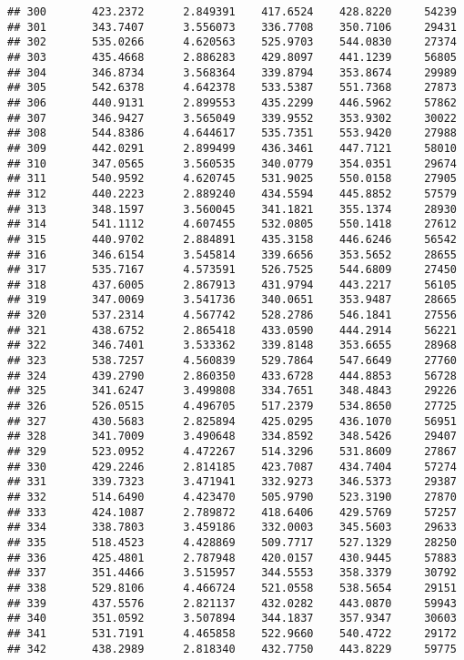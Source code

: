 \documentclass[]{article}
\begin{document}
\begin{verbatim}
## 300       423.2372      2.849391    417.6524    428.8220     54239
## 301       343.7407      3.556073    336.7708    350.7106     29431
## 302       535.0266      4.620563    525.9703    544.0830     27374
## 303       435.4668      2.886283    429.8097    441.1239     56805
## 304       346.8734      3.568364    339.8794    353.8674     29989
## 305       542.6378      4.642378    533.5387    551.7368     27873
## 306       440.9131      2.899553    435.2299    446.5962     57862
## 307       346.9427      3.565049    339.9552    353.9302     30022
## 308       544.8386      4.644617    535.7351    553.9420     27988
## 309       442.0291      2.899499    436.3461    447.7121     58010
## 310       347.0565      3.560535    340.0779    354.0351     29674
## 311       540.9592      4.620745    531.9025    550.0158     27905
## 312       440.2223      2.889240    434.5594    445.8852     57579
## 313       348.1597      3.560045    341.1821    355.1374     28930
## 314       541.1112      4.607455    532.0805    550.1418     27612
## 315       440.9702      2.884891    435.3158    446.6246     56542
## 316       346.6154      3.545814    339.6656    353.5652     28655
## 317       535.7167      4.573591    526.7525    544.6809     27450
## 318       437.6005      2.867913    431.9794    443.2217     56105
## 319       347.0069      3.541736    340.0651    353.9487     28665
## 320       537.2314      4.567742    528.2786    546.1841     27556
## 321       438.6752      2.865418    433.0590    444.2914     56221
## 322       346.7401      3.533362    339.8148    353.6655     28968
## 323       538.7257      4.560839    529.7864    547.6649     27760
## 324       439.2790      2.860350    433.6728    444.8853     56728
## 325       341.6247      3.499808    334.7651    348.4843     29226
## 326       526.0515      4.496705    517.2379    534.8650     27725
## 327       430.5683      2.825894    425.0295    436.1070     56951
## 328       341.7009      3.490648    334.8592    348.5426     29407
## 329       523.0952      4.472267    514.3296    531.8609     27867
## 330       429.2246      2.814185    423.7087    434.7404     57274
## 331       339.7323      3.471941    332.9273    346.5373     29387
## 332       514.6490      4.423470    505.9790    523.3190     27870
## 333       424.1087      2.789872    418.6406    429.5769     57257
## 334       338.7803      3.459186    332.0003    345.5603     29633
## 335       518.4523      4.428869    509.7717    527.1329     28250
## 336       425.4801      2.787948    420.0157    430.9445     57883
## 337       351.4466      3.515957    344.5553    358.3379     30792
## 338       529.8106      4.466724    521.0558    538.5654     29151
## 339       437.5576      2.821137    432.0282    443.0870     59943
## 340       351.0592      3.507894    344.1837    357.9347     30603
## 341       531.7191      4.465858    522.9660    540.4722     29172
## 342       438.2989      2.818340    432.7750    443.8229     59775
\end{verbatim}
\end{document}

